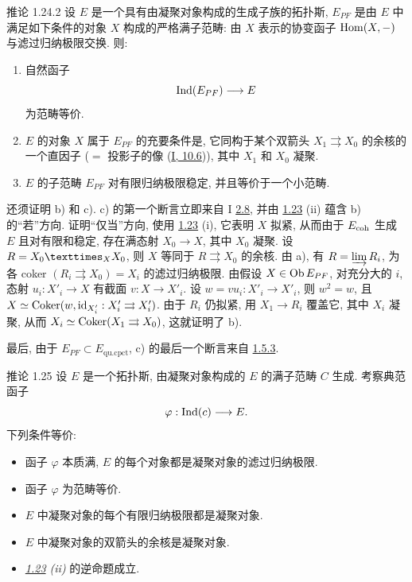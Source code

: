 \begin{enonce*}{推论 1.24.2}
设 $E$ 是一个具有由凝聚对象构成的生成子族的拓扑斯,
$E_{PF}$ 是由 $E$ 中满足如下条件的对象 $X$ 构成的严格满子范畴:
由 $X$ 表示的协变函子 $\operatorname{Hom}(X,-)$ 与滤过归纳极限交换.
则:
\begin{enumerate}
\renewcommand{\theenumi}{\alph{enumi}}
\renewcommand{\labelenumi}{\theenumi)}
\item 自然函子
$$
\Ind (E_{PF}) \to E
$$
为范畴等价.

\item $E$ 的对象 $X$ 属于 $E_{PF}$ 的充要条件是,
它同构于某个双箭头 $X_1\rightrightarrows X_0$ 的余核\pageoriginale{}的一个直因子
($=$ 投影子的像 (\hyperref[I.sec10.6]{I, 10.6})),
其中 $X_1$ 和 $X_0$ 凝聚.
\item $E$ 的子范畴 $E_{PF}$ 对有限归纳极限稳定,
并且等价于一个小范畴.
\end{enumerate}
\end{enonce*}

还须证明 b) 和 c).
c) 的第一个断言立即来自 I \hyperref[I.prop2.8]{2.8},
并由 \hyperref[VI.thm1.23]{1.23} (ii)
蕴含 b) 的“若”方向.
证明“仅当”方向, 使用 \hyperref[VI.thm1.23]{1.23} (i),
它表明 $X$ 拟紧,
从而由于 $E_{\mathrm{coh}}$ 生成 $E$ 且对有限和稳定,
存在满态射 $X_0\to X$, 其中 $X_0$ 凝聚.
设 $R=\fprod{X_0}{X_0}{X}$,
则 $X$ 等同于 $R\rightrightarrows X_0$ 的余核.
由 a), 有 $R=\varinjlim R_i$,
为各 coker $(R_i\rightrightarrows X_0)=X_i$ 的滤过归纳极限.
由假设 $X\in\operatorname{Ob} E_{PF}$,
对充分大的 $i$, 态射 $u_i:X'_i\to X$ 有截面 $v:X\to X'_i$.
设 $w=vu_i:X'_i\to X'_i$,
则 $w^2=w$, 且
$X\simeq\operatorname{Coker}(w,\operatorname{id}_{X'_i}:X'_i\rightrightarrows X'_i)$.
由于 $R_i$ 仍拟紧, 用 $X_1\to R_i$ 覆盖它,
其中 $X_i$ 凝聚,
从而 $X_i\simeq\operatorname{Coker}(X_1\rightrightarrows X_0)$,
这就证明了 b).

最后, 由于 $E_{PF}\subset E_{\text{qu.cpct}}$,
c) 的最后一个断言来自 \hyperref[VI.subsubsec1.5.3]{1.5.3}.

\begin{enonce*}{推论 1.25}
设 $E$ 是一个拓扑斯,
由凝聚对象构成的 $E$ 的满子范畴 $C$ 生成.
考察典范函子
$$
\varphi : \Ind(c) \to E{\quoi}.
$$
下列\pageoriginale{}条件等价:
\begin{itemize}
\item[(i)] 函子 $\varphi$ 本质满,
\ie $E$ 的每个对象都是凝聚对象的滤过归纳极限.

\item[(i bis)] 函子 $\varphi$ 为范畴等价.

\item[(ii)] $E$ 中凝聚对象的每个有限归纳极限都是凝聚对象.

\item[(ii bis)] $E$ 中凝聚对象的双箭头的余核是凝聚对象.

\item[(iii)] \emph{\hyperref[VI.thm1.23]{1.23} (ii)} 的逆命题成立.
\end{itemize}
\end{enonce*}

